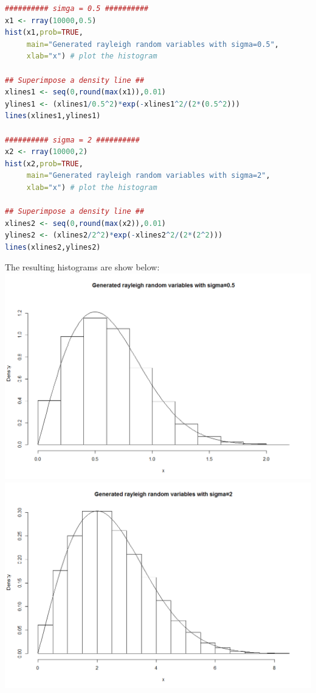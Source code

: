 \documentclass{amsart}
\theoremstyle{definition}
\theoremstyle{remark}
\begin{document}
\begin{enumerate}
\begin{lstlisting}[language=R]
########## simga = 0.5 ##########
x1 <- rray(10000,0.5)
hist(x1,prob=TRUE,
     main="Generated rayleigh random variables with sigma=0.5",
     xlab="x") # plot the histogram

## Superimpose a density line ##
xlines1 <- seq(0,round(max(x1)),0.01)
ylines1 <- (xlines1/0.5^2)*exp(-xlines1^2/(2*(0.5^2)))
lines(xlines1,ylines1)

########## sigma = 2 ##########
x2 <- rray(10000,2)
hist(x2,prob=TRUE,
     main="Generated rayleigh random variables with sigma=2",
     xlab="x") # plot the histogram

## Superimpose a density line ##
xlines2 <- seq(0,round(max(x2)),0.01)
ylines2 <- (xlines2/2^2)*exp(-xlines2^2/(2*(2^2)))
lines(xlines2,ylines2)
\end{lstlisting}
The resulting histograms are show below:\\
\includegraphics[scale=0.6]{rayleigh_0_5}
\includegraphics[scale=0.6]{rayleigh_2}
\end{enumerate}
\end{document}
